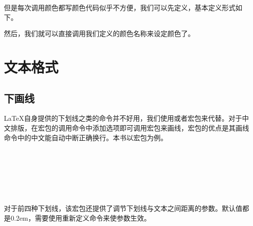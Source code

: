 \begin{latex}{}
\color[RGB]{204, 128, 92}{Color Text中文测试}
\end{latex}

但是每次调用颜色都写颜色代码似乎不方便，我们可以先定义，基本定义形式如下。
\begin{latex}{}
\usepackage{xcolor}									%
\end{latex}

然后，我们就可以直接调用我们定义的颜色名称来设定颜色了。

\begin{center}
\end{center}

\begin{latex}{}
\color{keyword}{\slshape function, return, if, true, false}
\end{latex}

\section{文本格式}

\subsection{下画线}

\LaTeX 自身提供的下划线之类的命令并不好用，我们使用或者宏包来代替。对于中文排版，在宏包的调用命令中添加选项即可调用宏包来画线，宏包的优点是其画线命令中的中文能自动中断正确换行。本书以宏包为例。

\begin{codeshow}
\\
\\
\\
\\
\\
\end{codeshow}

对于前四种下划线，该宏包还提供了调节下划线与文本之间距离的参数。默认值都是0.2em，需要使用重新定义命令来使参数生效。

